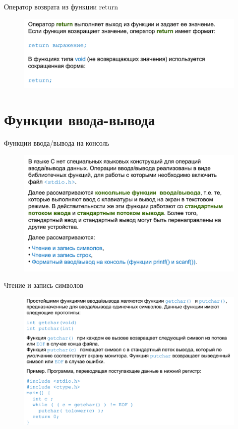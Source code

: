 \documentclass{beamer}
\begin{document}
\begin{frame}{Оператор возврата из функции return}
\begin{figure}[h]
\centering
\includegraphics[scale=0.4]{images/lec02-pic22.png}
\end{figure}
\end{frame}

\section{Функции ввода-вывода}

\begin{frame}{Функции ввода/вывода на консоль}
\begin{figure}[h]
\centering
\includegraphics[scale=0.4]{images/lec02-pic23.png}
\end{figure}
\end{frame}

\begin{frame}{Чтение и запись символов}
\begin{figure}[h]
\centering
\includegraphics[scale=0.4]{images/lec02-pic24.png}
\end{figure}
\end{frame}
\end{document}
